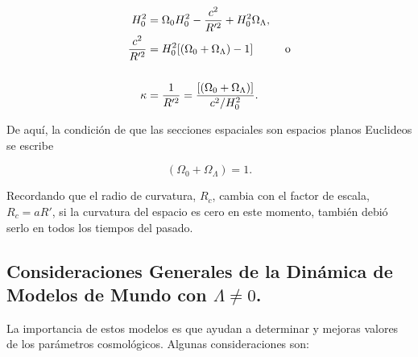 \documentclass[11pt]{article}
\begin{document}
    \begin{align}
        H_0^2 & = \Omega_0 H_0^2  - \frac{c^2}{R'^2} +  H_0^2 \Omega_{\Lambda}, \notag \\
        \frac{c^2}{R'^2} & = H_0^2 [(\Omega_0 + \Omega_{\Lambda}) - 1] \hspace{1cm} \text{o} \\
        \notag \\
        \kappa & = \frac{1}{R'^2} = \frac{[(\Omega_0 + \Omega_{\Lambda})]}{c^2/H_0^2}.
    \end{align}
        
   De aquí, la condición de que las secciones espaciales son espacios planos Euclideos se escribe 
   
   \begin{equation}
      (\Omega_0 + \Omega_{\Lambda}) = 1. 
   \end{equation}
  
   
   Recordando que el radio de curvatura, $R_c$, cambia con el factor de escala, $R_c=aR'$, si la curvatura del espacio es cero en este momento, también debió serlo en todos los tiempos del pasado. 
    
    
    
    \subsection{Consideraciones Generales de la Dinámica de Modelos de Mundo con $\Lambda \neq 0$. }
    
    La importancia de estos modelos es que ayudan a determinar y mejoras valores de los parámetros cosmológicos. Algunas consideraciones son: 
    
\end{document}
